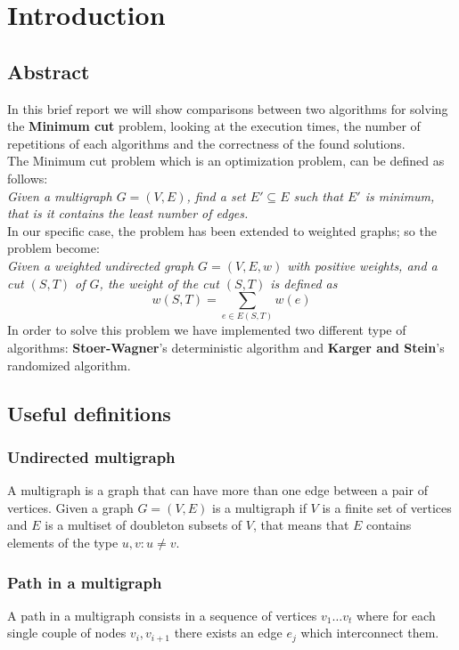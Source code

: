 \section{Introduction}

\subsection{Abstract}
In this brief report we will show comparisons between two algorithms for solving the \textbf{Minimum cut} problem, looking at the execution times, the number of repetitions of each algorithms and the correctness of the found solutions. \\ \noindent
The Minimum cut problem which is an optimization problem, can be defined as follows: \\ \noindent
\textit{Given a multigraph $G = (V,E)$, find a set $E' \subseteq E$ such that $E'$ is minimum, that is it contains the least number of edges.} \\
\noindent
In our specific case, the problem has been extended to weighted graphs; so the problem become: \\ \noindent
\textit{Given a weighted undirected graph $G = (V, E, w)$ with positive weights, and a cut $(S,T)$ of $G$, the weight of the cut $(S,T)$ is defined as
\[
    w(S,T) = \sum_{e \in E(S,T)} w(e)
\]
}\noindent
In order to solve this problem we have implemented two different type of algorithms: \textbf{Stoer-Wagner}'s deterministic algorithm and \textbf{Karger and Stein}'s randomized algorithm.

\subsection{Useful definitions}

\subsubsection*{Undirected multigraph}
A multigraph is a graph that can have more than one edge between a pair of vertices. Given a graph $G = (V, E)$ is a multigraph if $V$ is a finite set of vertices and $E$ is a multiset of doubleton subsets of $V$, that means that $E$ contains elements of the type ${u,v}: u \neq v$.

\subsubsection*{Path in a multigraph}
A path in a multigraph consists in a sequence of vertices $v_1 \dots v_t$ where for each single couple of nodes ${v_i, v_{i+1}}$ there exists an edge $e_j$ which interconnect them.

